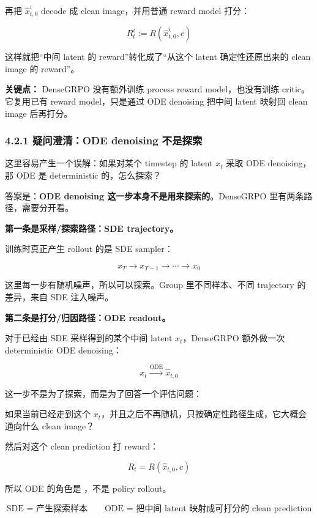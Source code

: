 再把 \(\hat{x}^i_{t,0}\) decode 成 clean image，并用普通 reward model 打分：

\[
R^i_t
:=
R(\hat{x}^i_{t,0}, c)
\]

这样就把“中间 latent 的 reward”转化成了“从这个 latent 确定性还原出来的 clean image 的 reward”。

\begin{summarybox}
\textbf{关键点：} DenseGRPO 没有额外训练 process reward model，也没有训练 critic。它复用已有 reward model，只是通过 ODE denoising 把中间 latent 映射回 clean image 后再打分。
\end{summarybox}

\subsubsection{4.2.1 疑问澄清：ODE denoising 不是探索}

这里容易产生一个误解：如果对某个 timestep 的 latent \(x_t\) 采取 ODE denoising，那 ODE 是 deterministic 的，怎么探索？

答案是：\textbf{ODE denoising 这一步本身不是用来探索的}。DenseGRPO 里有两条路径，需要分开看。

\textbf{第一条是采样/探索路径：SDE trajectory。}

训练时真正产生 rollout 的是 SDE sampler：

\[
x_T \rightarrow x_{T-1} \rightarrow \cdots \rightarrow x_0
\]

这里每一步有随机噪声，所以可以探索。Group 里不同样本、不同 trajectory 的差异，来自 SDE 注入噪声。

\textbf{第二条是打分/归因路径：ODE readout。}

对于已经由 SDE 采样得到的某个中间 latent \(x_t\)，DenseGRPO 额外做一次 deterministic ODE denoising：

\[
x_t
\xrightarrow{\mathrm{ODE}}
\hat{x}_{t,0}
\]

这一步不是为了探索，而是为了回答一个评估问题：

\begin{intubox}
如果当前已经走到这个 \(x_t\)，并且之后不再随机，只按确定性路径生成，它大概会通向什么 clean image？
\end{intubox}

然后对这个 clean prediction 打 reward：

\[
R_t = R(\hat{x}_{t,0}, c)
\]

所以 ODE 的角色是 ，不是 policy rollout。

\[
\text{SDE = 产生探索样本}
\qquad
\text{ODE = 把中间 latent 映射成可打分的 clean prediction}
\]

